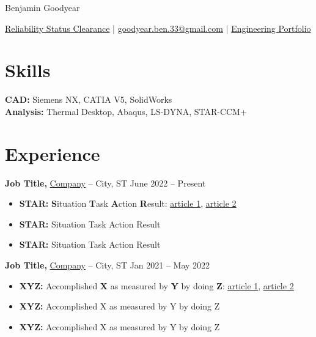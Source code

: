 \documentclass[11pt]{article}       %
\begin{document}
\centerline{\Huge Benjamin Goodyear}

\vspace{5pt}

\centerline{\href{}{Reliability Status Clearance} | \href{mailto:goodyear.ben.33@gmail.com}{goodyear.ben.33@gmail.com} | \href{https://goodyear33.github.io/}{Engineering Portfolio}
}

\vspace{-10pt}

\section*{Skills}
\textbf{CAD:} Siemens NX, CATIA V5, SolidWorks \\
\textbf{Analysis:} Thermal Desktop, Abaqus, LS-DYNA, STAR-CCM+

\vspace{-6.5pt}

\section*{Experience}
\textbf{Job Title,} \href{https://www.fstl1992.com/}{Company} -- City, ST \hfill June 2022 -- Present \\
\vspace{-9pt}
\begin{itemize}
  \item \textbf{STAR:} \textbf{S}ituation \textbf{T}ask \textbf{A}ction \textbf{R}esult: \href{https://www.levels.fyi/blog/applying-star-method-resumes.html}{\underline{article 1}}, \href{https://resumegenius.com/blog/resume-help/star-method-resume}{\underline{article 2}}
  \item \textbf{STAR:} Situation Task Action Result
  \item \textbf{STAR:} Situation Task Action Result
\end{itemize}

\textbf{Job Title,} \href{https://www.fstl1992.com/}{Company} -- City, ST \hfill Jan 2021 -- May 2022 \\
\vspace{-9pt}
\begin{itemize}
  \item \textbf{XYZ:} Accomplished \textbf{X} as measured by \textbf{Y} by doing \textbf{Z}: \href{https://www.inc.com/bill-murphy-jr/google-recruiters-say-these-5-resume-tips-including-x-y-z-formula-will-improve-your-odds-of-getting-hired-at-google.html}{\underline{article 1}}, \href{https://elevenrecruiting.com/create-an-effective-resume-xyz-resume-format/}{\underline{article 2}}
  \item \textbf{XYZ:} Accomplished X as measured by Y by doing Z
  \item \textbf{XYZ:} Accomplished X as measured by Y by doing Z
\end{itemize}
\end{document}
